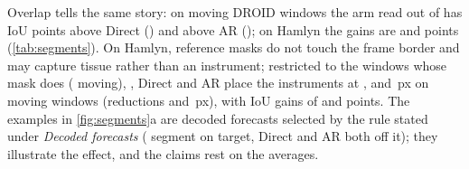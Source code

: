 Overlap
tells the same story: on moving DROID windows the arm read out of \ours{} has IoU \good{\segDroidMovGainDi{}} points above
Direct (\segDroidMovGainDiCI{}) and \good{\segDroidMovGainAR{}} above AR (\segDroidMovGainARCI{}); on Hamlyn the
gains are \segHamlynMovGainDi{} \segHamlynMovGainDiCI{} and \segHamlynMovGainAR{} \segHamlynMovGainARCI{} points
(\cref{tab:segments}). On Hamlyn, \segHamlynBorderExcluded{} reference masks do not touch the frame border and may
capture tissue rather than an instrument; restricted to the \segHamlynBorderWindows{} windows whose mask does
(\segHamlynBorderMoving{} moving), \ours{}, Direct and AR place the instruments at \segHamlynBorderPlaceSW{},
\segHamlynBorderPlaceDi{} and \segHamlynBorderPlaceAR{}\,px on moving windows (reductions \segHamlynBorderRedDi{}
\segHamlynBorderRedDiCI{} and \segHamlynBorderRedAR{} \segHamlynBorderRedARCI{}\,px), with IoU gains of
\segHamlynBorderGainDi{} \segHamlynBorderGainDiCI{} and \segHamlynBorderGainAR{} \segHamlynBorderGainARCI{} points. The examples in \cref{fig:segments}a are
decoded forecasts selected by the rule stated under \emph{Decoded forecasts} (\ours{} segment on target, Direct and AR
both off it); they illustrate the effect, and the claims rest on the averages.
